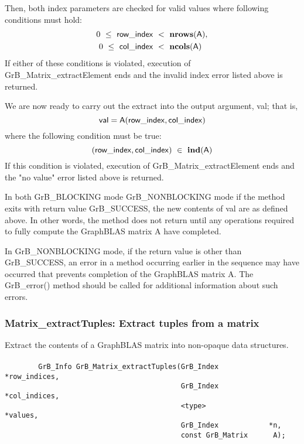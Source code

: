 Then, both index parameters are checked for valid values where following
conditions must hold:
\[
\begin{aligned}
    0\ \leq\ {\sf row\_index} & \ <\ \mathbf{nrows}({\sf A}), \\
    0\ \leq\ {\sf col\_index} & \ <\ \mathbf{ncols}({\sf A})
\end{aligned}
\]
If either of these conditions is violated, execution of 
{\sf GrB\_Matrix\_extractElement} ends and the invalid 
index error listed above is returned. 

We are now ready to carry out the extract into the output argument, {\sf val}; 
that is,
\[
{\sf val} = {\sf A}({\sf row\_index},{\sf col\_index})
\]
where the following condition must be true:
\[
    ({\sf row\_index},{\sf col\_index}) \ \in \ \mathbf{ind}({\sf A})
\]
If this condition is violated, execution of {\sf GrB\_Matrix\_extractElement} 
ends and the "no value" error listed above is returned.


In both {\sf GrB\_BLOCKING} mode {\sf GrB\_NONBLOCKING} mode
if the method exits with return value {\sf GrB\_SUCCESS}, the  new 
contents of  {\sf val} are as defined above.  In other words, the method
does not return until any operations required to fully compute 
the GraphBLAS matrix {\sf A} have completed. 

In {\sf GrB\_NONBLOCKING} mode, if the return value is 
other than  {\sf GrB\_SUCCESS}, an error in a method occurring earlier in the sequence
may have occurred that prevents completion of the GraphBLAS matrix {\sf A}.
The {\sf GrB\_error()} method should be called for additional information 
about such errors.



\subsubsection{{\sf Matrix\_extractTuples}: Extract tuples from a matrix}
\label{Sec:Matrix_extractTuples}

Extract the contents of a GraphBLAS matrix into non-opaque data structures.

\paragraph{\syntax}

\begin{verbatim}
        GrB_Info GrB_Matrix_extractTuples(GrB_Index            *row_indices,
                                          GrB_Index            *col_indices,
                                          <type>               *values, 
                                          GrB_Index            *n, 
                                          const GrB_Matrix      A);
\end{verbatim}

